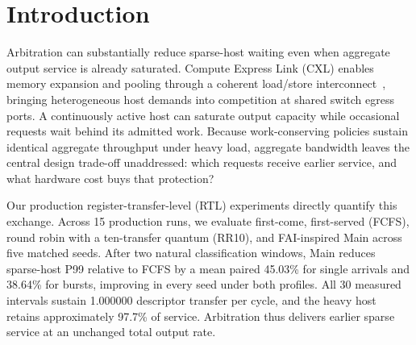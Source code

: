 \begin{abstract}
Windowed classification reduces sparse-host waiting under sustained interference
without sacrificing descriptor output service. In a unified register-transfer-level
(RTL) study of a single-output Compute Express Link (CXL) switch slice, the
FAI-inspired Main policy reduces sparse-host generation-to-fire P99 relative to
first-come, first-served (FCFS) by a mean paired 45.03\% for single arrivals and 38.64\% for
eight-request bursts. After two natural classification windows, both profiles
improve across all five matched seeds; all 15 production RTL runs pass.
All 30 measured intervals sustain the saturated
descriptor-level output capacity of 1.000000 transfer/cycle, with the heavy
host retaining approximately 97.7\% of service. Round robin with a ten-transfer
quantum (RR10) achieves a 3.6-cycle advantage in mean burst P99, while Main retains
a one-cycle advantage for single arrivals. Main's pre-layout area premium is
4.97--5.89\% over FCFS and 38.22--39.27\% over RR10. First-in, first-out
(FIFO) subtrees occupy 92.40--98.63\% of mapped standard-cell area; all nine
primary mappings close timing at 25\,ns. Independent audits and 14/14 scoped
formal RTL-to-netlist equivalence checks support the implementation comparison.
Classification shields sparse hosts relative to FCFS at a modest area
premium; per-source rotation yields lower measured burst P99 than Main.
Queue storage and ordering metadata dominate implementation cost.
\end{abstract}

\section{Introduction}
Arbitration can substantially reduce sparse-host waiting even when aggregate
output service is already saturated. Compute Express Link (CXL) enables memory
expansion and pooling through a coherent load/store interconnect~\cite{cxl_intro},
bringing heterogeneous host demands into competition at shared switch egress
ports. A continuously active host can saturate output capacity while occasional
requests wait behind its admitted work. Because work-conserving policies sustain
identical aggregate throughput under heavy load, aggregate bandwidth leaves the
central design trade-off unaddressed: which requests receive earlier service,
and what hardware cost buys that protection?

Our production register-transfer-level (RTL) experiments directly quantify this
exchange. Across 15 production runs, we evaluate first-come, first-served (FCFS),
round robin with a ten-transfer quantum (RR10), and FAI-inspired Main across
five matched seeds. After two natural classification windows, Main reduces
sparse-host P99 relative to FCFS by a mean paired 45.03\% for single arrivals and
38.64\% for bursts, improving in every seed under both profiles. All 30 measured
intervals sustain 1.000000 descriptor transfer per cycle, and the heavy host
retains approximately 97.7\% of service. Arbitration thus delivers earlier
sparse service at an unchanged total output rate.

